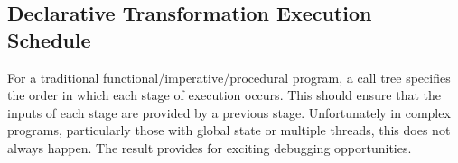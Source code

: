 \documentclass{llncs}
\begin{document}





\subsection{Declarative Transformation Execution Schedule}

For a traditional functional/imperative/procedural program, a call tree specifies the order in which each stage of execution occurs. This should ensure that the inputs of each stage are provided by a previous stage. Unfortunately in complex programs, particularly those with global state or multiple threads, this does not always happen. The result provides for exciting debugging opportunities.
\end{document}
